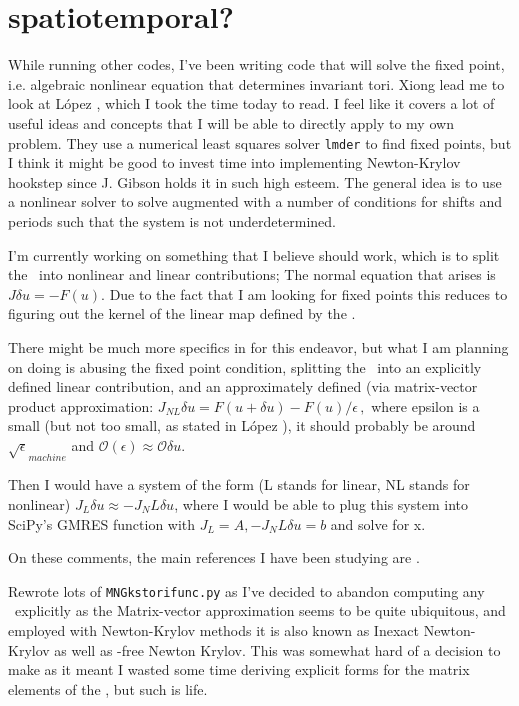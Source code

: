 \section{spatiotemporal?}
While running other codes, I've been writing code that will solve the fixed point, i.e. algebraic
nonlinear equation that determines invariant tori.
Xiong lead me to look at L{\'o}pez \etal{}, which I took the time today to
read. I feel like it covers a lot of useful ideas and concepts that I will be
able to directly apply to my own problem. They use a numerical least squares
solver \texttt{lmder} to find fixed points, but I think it might be good to
invest time into implementing Newton-Krylov hookstep since J. Gibson holds it in
such high esteem. The general idea is to use a nonlinear solver to solve
 augmented with a number of conditions for shifts and
periods such that the system is not underdetermined.

I'm currently working on something that I believe should work, which is to split
the \jacobianM\ into nonlinear and linear contributions; The normal equation that
arises is $J \delta u = -F(u)$. Due to the fact that I am looking for fixed points
this reduces to figuring out the kernel of the linear map defined by the \jacobianM.

There might be much more specifics in for this endeavor, but what I am planning
on doing is abusing the fixed point condition, splitting the \jacobianM\ into
an explicitly defined linear contribution, and an approximately defined (via
matrix-vector product approximation:
\(
J_{NL} \delta u = F(u + \delta u) - F(u)/ \epsilon
\,,
\)
where epsilon is a small (but not too small, as stated in
L{\'o}pez \etal{}), it should probably be around $\sqrt{\epsilon}_{machine}$ and
$\mathcal{O}(\epsilon) \approx \mathcal{O} \delta u$.

Then I would have a system of the form (L stands for linear, NL stands for nonlinear)
$J_L \delta u \approx - J_NL \delta u$, where I would be able to plug this system
into SciPy's GMRES function with $J_L = A, -J_NL \delta u = b$ and solve for x.

On these comments, the main references I have been studying are
.

Rewrote lots of \texttt{MNGkstorifunc.py} as I've decided to abandon computing any \jacobianM\ explicitly
as the Matrix-vector approximation seems to be quite ubiquitous, and employed with Newton-Krylov methods it
is also known as Inexact Newton-Krylov as well as
\jacobianM-free Newton Krylov. This was somewhat hard of a decision to make as it meant I wasted some time
deriving explicit forms for the matrix elements of the \jacobianMs, but such is life.


